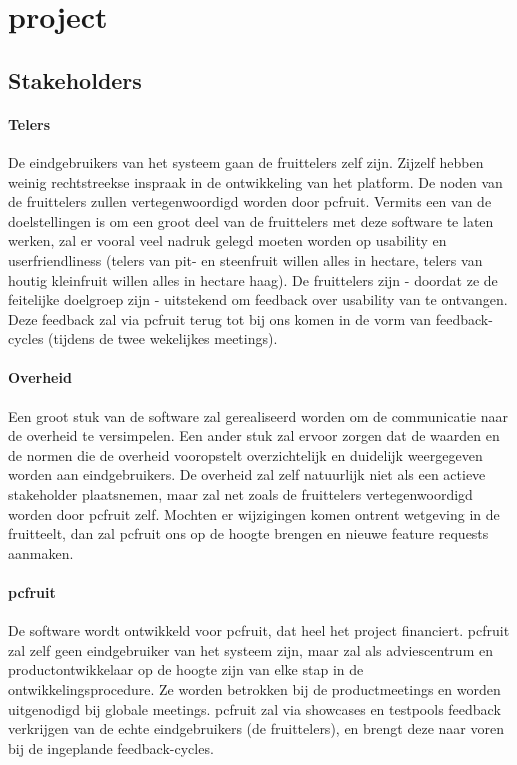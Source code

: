 \section {project}


\subsection {Stakeholders}

\paragraph {Telers} De eindgebruikers van het systeem gaan de fruittelers zelf zijn.
Zijzelf hebben weinig rechtstreekse inspraak in de ontwikkeling van het platform. De noden
van de fruittelers zullen vertegenwoordigd worden door pcfruit. Vermits een van de
doelstellingen is om een groot deel van de fruittelers met deze software te laten werken,
zal er vooral veel nadruk gelegd moeten worden op usability en userfriendliness (telers
van pit- en steenfruit willen alles in hectare, telers van houtig kleinfruit willen alles in
hectare haag). De
fruittelers zijn - doordat ze de feitelijke doelgroep zijn - uitstekend om feedback over
usability van te ontvangen. Deze feedback zal via pcfruit terug tot bij ons komen in de
vorm van feedback-cycles (tijdens de twee wekelijkes meetings).

\paragraph {Overheid} Een groot stuk van de software zal gerealiseerd worden om de
communicatie naar de overheid te versimpelen. Een ander stuk zal ervoor zorgen dat de
waarden en de normen die de overheid vooropstelt overzichtelijk en duidelijk weergegeven
worden aan eindgebruikers. De overheid zal zelf natuurlijk niet als een actieve
stakeholder plaatsnemen, maar zal net zoals de fruittelers vertegenwoordigd worden door
pcfruit zelf. Mochten er wijzigingen komen ontrent wetgeving in de fruitteelt, dan zal
pcfruit ons op de hoogte brengen en nieuwe feature requests aanmaken.

\paragraph {pcfruit} De software wordt ontwikkeld voor pcfruit, dat heel het project
financiert. pcfruit zal zelf geen eindgebruiker van het systeem zijn, maar zal als
adviescentrum en productontwikkelaar op de hoogte zijn van elke stap in de
ontwikkelingsprocedure. Ze worden betrokken bij de productmeetings en worden uitgenodigd
bij globale meetings. pcfruit zal via showcases en testpools feedback verkrijgen van de
echte eindgebruikers (de fruittelers), en brengt deze naar voren bij de ingeplande
feedback-cycles.

